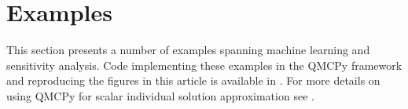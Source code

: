 \documentclass[graybox]{svmult}
\begin{document}
\section{Examples} \label{SoRa_sec:examples}

This section presents a number of examples spanning machine learning and sensitivity analysis. Code implementing these examples in the QMCPy framework and reproducing the figures in this article is available in \cite{vectorized_qmc_demo_notebook}. For more details on using QMCPy for scalar individual solution approximation see \cite{QMCSoftware}.

% 
\end{document}
